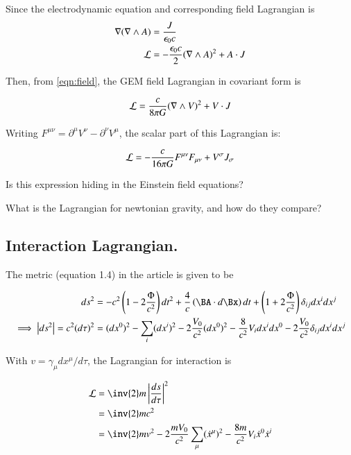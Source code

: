\documentclass{article}
\begin{document}
Since the electrodynamic equation and corresponding field Lagrangian is
\begin{align*}
\nabla (\nabla \wedge A) &= \frac{J}{\epsilon_0 c} \\
\mathcal{L} &= -\frac{\epsilon_0 c}{2} (\nabla \wedge A)^2 + A \cdot J
\end{align*}

Then, from \ref{eqn:field}, the GEM field Lagrangian in covariant form is

\begin{align*}
\mathcal{L} &= \frac{c}{8 \pi G} (\nabla \wedge V)^2 + V \cdot J \\
\end{align*}

Writing $F^{\mu\nu} = \partial^\mu V^\nu - \partial^\nu V^\mu$, the scalar part of this Lagrangian is:

\begin{align*}
\mathcal{L} &= -\frac{c}{16 \pi G} F^{\mu\nu} F_{\mu\nu} + V^\sigma J_\sigma \\
\end{align*}

Is this expression hiding in the Einstein field equations?

What is the Lagrangian for newtonian gravity, and how do they compare?

\subsection{ Interaction Lagrangian. }

The metric (equation 1.4) in the article is given to be

\begin{align*}
ds^2 &= 
-c^2\left(1 - 2 \frac{\Phi}{c^2}\right) dt^2
+\frac{4}{c}\left(\BA \cdot d\Bx \right) dt 
+\left(1 + 2 \frac{\Phi}{c^2}\right) \delta_{ij}dx^i dx^j \\
\implies
\Abs{ds^2} = c^2 (d\tau)^2 &= (dx^0)^2 - \sum_i (dx^i)^2
-2 \frac{V_0}{c^2} (dx^0)^2
-\frac{8}{c^2} V_i dx^i dx^0
- 2 \frac{V_0}{c^2} \delta_{ij}dx^i dx^j
\end{align*}

With $v = \gamma_\mu dx^\mu/d\tau$, the Lagrangian for interaction is

\begin{align*}
\LL 
&= \inv{2} m \Abs{\frac{ds}{d\tau}}^2  \\
&= \inv{2} m c^2 \\
&= \inv{2} m v^2 -2 \frac{m V_0}{c^2} \sum_\mu (\xdot^\mu)^2 -\frac{8 m}{c^2} V_i \xdot^0 \xdot^i  \\
\end{align*}
\end{document}
